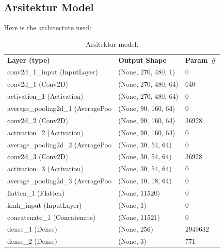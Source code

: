 \documentclass[conference]{IEEEtran}
\begin{document}

\subsection{Arsitektur Model}
\label{sec:arsitektur_model}

Here is the architecture used:

\begin{table}[H]
	\begin{tabular}{lll}
		\textbf{Layer (type)}                      & \textbf{Output Shape}         & \textbf{Param \#} \\
		conv2d\_1\_input (InputLayer)     & (None, 270, 480, 1)  & 0        \\
		conv2d\_1 (Conv2D)                & (None, 270, 480, 64) & 640      \\
		activation\_1 (Activation)        & (None, 270, 480, 64) & 0        \\
		average\_pooling2d\_1 (AveragePoo & (None, 90, 160, 64)  & 0        \\
		conv2d\_2 (Conv2D)                & (None, 90, 160, 64)  & 36928    \\
		activation\_2 (Activation)        & (None, 90, 160, 64)  & 0        \\
		average\_pooling2d\_2 (AveragePoo & (None, 30, 54, 64)   & 0        \\
		conv2d\_3 (Conv2D)                & (None, 30, 54, 64)   & 36928    \\
		activation\_3 (Activation)        & (None, 30, 54, 64)   & 0        \\
		average\_pooling2d\_3 (AveragePoo & (None, 10, 18, 64)   & 0        \\
		flatten\_1 (Flatten)              & (None, 11520)        & 0        \\
		kmh\_input (InputLayer)           & (None, 1)            & 0        \\
		concatenate\_1 (Concatenate)      & (None, 11521)        & 0        \\
		dense\_1 (Dense)                  & (None, 256)          & 2949632  \\
		dense\_2 (Dense)                  & (None, 3)            & 771     
	\end{tabular}
	\caption{Arsitektur model.}
	\label{tb:arsitektur_model}
\end{table}
\end{document}

